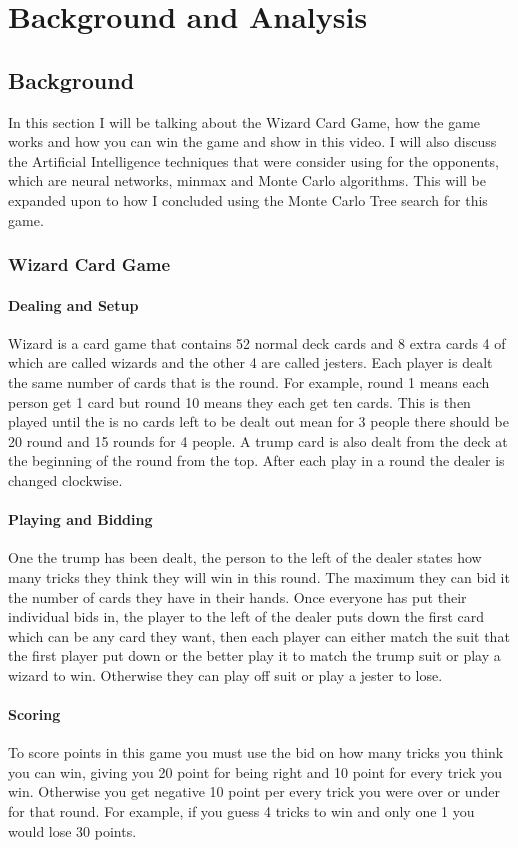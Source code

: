 \chapter{Background and Analysis}
\section{Background}
In this section I will be talking about the Wizard Card Game, how the game works and how you can win the game and show in this video\cite{wizardVideo}. I will also discuss the Artificial Intelligence techniques that were consider using for the opponents, which are neural networks, minmax and Monte Carlo algorithms. This will be expanded upon to how I concluded using the Monte Carlo Tree search for this game.
\subsection{Wizard Card Game}
\subsubsection{Dealing and Setup}
Wizard is a card game that contains 52 normal deck cards and 8 extra cards 4 of which are called wizards and the other 4 are called jesters\cite{wizardOver}. Each player is dealt the same number of cards that is the round. For example, round 1 means each person get 1 card but round 10 means they each get ten cards. This is then played until the is no cards left to be dealt out mean for 3 people there should be 20 round and 15 rounds for 4 people. A trump card is also dealt from the deck at the beginning of the round from the top. After each play in a round the dealer is changed clockwise.
\subsubsection{Playing and Bidding}
One the trump has been dealt, the person to the left of the dealer states how many tricks they think they will win in this round. The maximum they can bid it the number of cards they have in their hands. Once everyone has put their individual bids in, the player to the left of the dealer puts down the first card which can be any card they want, then each player can either match the suit that the first player put down or the better play it to match the trump suit or play a wizard to win. Otherwise they can play off suit or play a jester to lose.
\subsubsection{Scoring}
To score points in this game you must use the bid on how many tricks you think you can win, giving you 20 point for being right and 10 point for every trick you win. Otherwise you get negative 10 point per every trick you were over or under for that round. For example, if you guess 4 tricks to win and only one 1 you would lose 30 points. 

